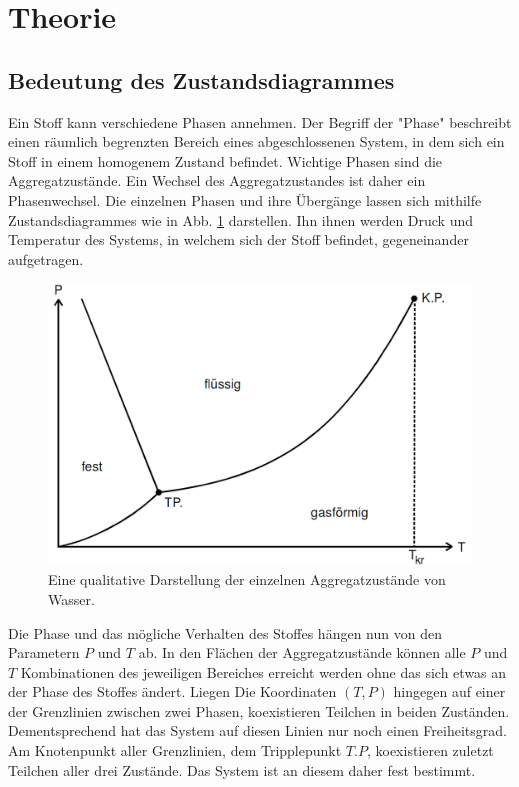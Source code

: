 
\section{Theorie}
\label{sec:Theorie}
\subsection{Bedeutung des Zustandsdiagrammes}
Ein Stoff kann verschiedene Phasen annehmen. Der Begriff der "Phase" beschreibt
 einen räumlich begrenzten Bereich eines abgeschlossenen System, in dem sich ein Stoff
  in einem homogenem Zustand befindet. Wichtige Phasen sind die Aggregatzustände.
  Ein Wechsel des Aggregatzustandes ist daher ein Phasenwechsel.
  Die einzelnen Phasen und ihre Übergänge lassen sich mithilfe Zustandsdiagrammes
   wie in Abb. \ref{fig:diagram} darstellen. Ihn ihnen werden Druck und Temperatur
    des Systems, in welchem sich der Stoff befindet, gegeneinander aufgetragen.
  \begin{figure}
	\centering
	\includegraphics[width=\linewidth-150pt,height=\textheight-150pt,keepaspectratio]{content/Bilder/zustand.png}
	\caption{Eine qualitative Darstellung der einzelnen Aggregatzustände von Wasser\cite{V203}.}
	\label{fig:diagram}
\end{figure}
  Die Phase und das mögliche Verhalten des Stoffes hängen nun von den Parametern $P$ und $T$ ab.
  In den Flächen der Aggregatzustände können alle $P$ und $T$
   Kombinationen des jeweiligen Bereiches erreicht werden ohne das sich etwas an der Phase des Stoffes ändert.
    Liegen Die Koordinaten $(T,P)$ hingegen auf einer der Grenzlinien zwischen
    zwei Phasen, koexistieren Teilchen in beiden Zuständen.
    Dementsprechend hat das System auf diesen Linien nur noch einen Freiheitsgrad.
    Am Knotenpunkt aller Grenzlinien, dem Tripplepunkt $T.P$, koexistieren zuletzt Teilchen aller drei
     Zustände. Das System ist an diesem daher fest bestimmt.

